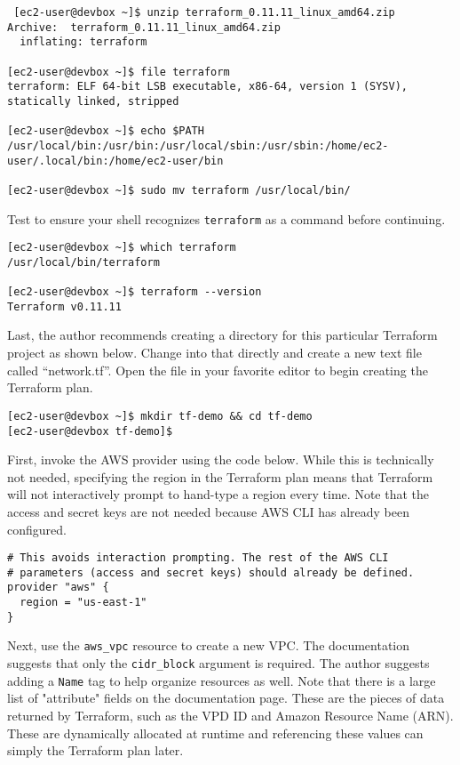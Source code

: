 \begin{verbatim}
 [ec2-user@devbox ~]$ unzip terraform_0.11.11_linux_amd64.zip
Archive:  terraform_0.11.11_linux_amd64.zip
  inflating: terraform

[ec2-user@devbox ~]$ file terraform
terraform: ELF 64-bit LSB executable, x86-64, version 1 (SYSV), statically linked, stripped

[ec2-user@devbox ~]$ echo $PATH
/usr/local/bin:/usr/bin:/usr/local/sbin:/usr/sbin:/home/ec2-user/.local/bin:/home/ec2-user/bin

[ec2-user@devbox ~]$ sudo mv terraform /usr/local/bin/
\end{verbatim}

Test to ensure your shell recognizes \verb|terraform| as a command before continuing.

\begin{verbatim}
[ec2-user@devbox ~]$ which terraform
/usr/local/bin/terraform

[ec2-user@devbox ~]$ terraform --version
Terraform v0.11.11
\end{verbatim}

Last, the author recommends creating a directory for this particular Terraform
project as shown below. Change into that directly and create a new text file
called ``network.tf''. Open the file in your favorite editor to begin creating
the Terraform plan.

\begin{verbatim}
[ec2-user@devbox ~]$ mkdir tf-demo && cd tf-demo
[ec2-user@devbox tf-demo]$
\end{verbatim}

First, invoke the AWS provider using the code below. While this is technically
not needed, specifying the region in the Terraform plan means that Terraform
will not interactively prompt to hand-type a region every time. Note that the
access and secret keys are not needed because AWS CLI has already been configured.

\begin{verbatim}
# This avoids interaction prompting. The rest of the AWS CLI
# parameters (access and secret keys) should already be defined.
provider "aws" {
  region = "us-east-1"
}
\end{verbatim}

Next, use the \verb|aws_vpc| resource to create a new VPC. The documentation
suggests that only the \verb|cidr_block| argument is required. The author
suggests adding a \verb|Name| tag to help organize resources as well. Note
that there is a large list of "attribute" fields on the documentation page.
These are the pieces of data returned by Terraform, such as the VPD ID and
Amazon Resource Name (ARN). These are dynamically allocated at runtime and
referencing these values can simply the Terraform plan later.

